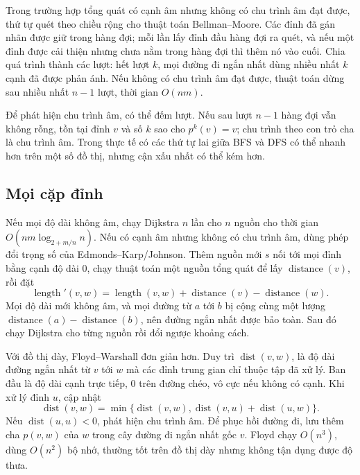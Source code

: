 \documentclass[11pt]{article}
\begin{document}
Trong trường hợp tổng quát có cạnh âm nhưng không có chu trình âm đạt được,
thứ tự quét theo chiều rộng cho thuật toán Bellman--Moore. Các đỉnh đã gán nhãn
được giữ trong hàng đợi; mỗi lần lấy đỉnh đầu hàng đợi ra quét, và nếu một đỉnh
được cải thiện nhưng chưa nằm trong hàng đợi thì thêm nó vào cuối. Chia quá
trình thành các lượt: hết lượt \(k\), mọi đường đi ngắn nhất dùng nhiều nhất
\(k\) cạnh đã được phản ánh. Nếu không có chu trình âm đạt được, thuật toán dừng
sau nhiều nhất \(n-1\) lượt, thời gian \(O(nm)\).

Để phát hiện chu trình âm, có thể đếm lượt. Nếu sau lượt \(n-1\) hàng đợi vẫn
không rỗng, tồn tại đỉnh \(v\) và số \(k\) sao cho \(p^k(v)=v\); chu trình theo
con trỏ cha là chu trình âm. Trong thực tế có các thứ tự lai giữa BFS và DFS có
thể nhanh hơn trên một số đồ thị, nhưng cận xấu nhất có thể kém hơn.

\subsection*{Mọi cặp đỉnh}

Nếu mọi độ dài không âm, chạy Dijkstra \(n\) lần cho \(n\) nguồn cho thời gian
\(O(nm\log_{2+m/n} n)\). Nếu có cạnh âm nhưng không có chu trình âm, dùng phép
đổi trọng số của Edmonds--Karp/Johnson. Thêm nguồn mới \(s\) nối tới mọi đỉnh
bằng cạnh độ dài \(0\), chạy thuật toán một nguồn tổng quát để lấy
\(\operatorname{distance}(v)\), rồi đặt
\[
  \operatorname{length}'(v,w)=
  \operatorname{length}(v,w)+\operatorname{distance}(v)-\operatorname{distance}(w).
\]
Mọi độ dài mới không âm, và mọi đường từ \(a\) tới \(b\) bị cộng cùng một lượng
\(\operatorname{distance}(a)-\operatorname{distance}(b)\), nên đường ngắn nhất
được bảo toàn. Sau đó chạy Dijkstra cho từng nguồn rồi đổi ngược khoảng cách.

Với đồ thị dày, Floyd--Warshall đơn giản hơn. Duy trì
\(\operatorname{dist}(v,w)\), là độ dài đường ngắn nhất từ \(v\) tới \(w\) mà
các đỉnh trung gian chỉ thuộc tập đã xử lý. Ban đầu là độ dài cạnh trực tiếp,
\(0\) trên đường chéo, vô cực nếu không có cạnh. Khi xử lý đỉnh \(u\), cập nhật
\[
  \operatorname{dist}(v,w) =
  \min\{\operatorname{dist}(v,w),
       \operatorname{dist}(v,u)+\operatorname{dist}(u,w)\}.
\]
Nếu \(\operatorname{dist}(u,u)<0\), phát hiện chu trình âm. Để phục hồi đường
đi, lưu thêm cha \(p(v,w)\) của \(w\) trong cây đường đi ngắn nhất gốc \(v\).
Floyd chạy \(O(n^3)\), dùng \(O(n^2)\) bộ nhớ, thường tốt trên đồ thị dày nhưng
không tận dụng được độ thưa.
\end{document}
